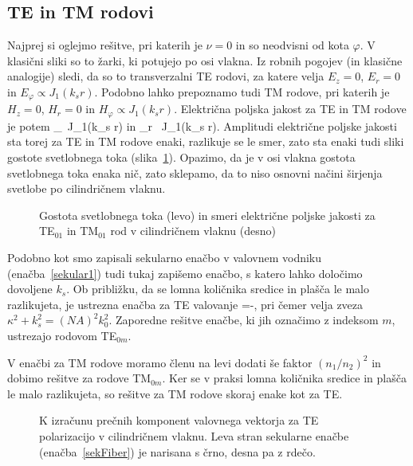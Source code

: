 \subsection*{TE in TM rodovi}
Najprej si oglejmo rešitve, pri katerih je $\nu=0$ in so neodvisni od kota $\varphi$. 
V klasični sliki so to žarki, ki potujejo
po osi vlakna. Iz robnih pogojev (in klasične analogije) sledi, da 
so to transverzalni TE rodovi, za katere velja $E_z=0$, $E_r=0$ in $E_\varphi \propto J_1(k_sr)$.
Podobno lahko prepoznamo tudi TM rodove, pri katerih je $H_z=0$, $H_r=0$ in $H_\varphi \propto J_1(k_sr)$.
Električna poljska jakost za TE in TM rodove je potem
\beq
{} \propto {}_\varphi \, J_1(k_s r) \qquad \textrm{in} \qquad 
{} \propto {}_r \, J_1(k_s r).
\eeq
Amplitudi električne poljske jakosti sta torej za TE in TM rodove enaki, razlikuje se le smer, zato
sta enaki tudi sliki gostote svetlobnega toka (slika~\ref{fig:TE01}). Opazimo, da je v osi
vlakna gostota svetlobnega toka enaka nič, zato sklepamo, da to niso osnovni načini 
širjenja svetlobe po cilindričnem vlaknu. 
\begin{figure}[h]
\centering
\def\svgwidth{100truemm} 

\caption{Gostota svetlobnega toka (levo) in smeri električne poljske jakosti 
za TE$_{01}$ in TM$_{01}$ rod v cilindričnem vlaknu (desno)}
\label{fig:TE01}
\end{figure}

Podobno kot smo zapisali sekularno enačbo v valovnem vodniku (enačba~\ref{sekular1}) tudi tukaj
zapišemo enačbo, s katero lahko določimo dovoljene $k_s$. 
Ob približku, da se lomna količnika 
sredice in plašča le malo razlikujeta, je ustrezna enačba za TE valovanje
\beq
{}=-,
\label{sekFiber}
\eeq
pri čemer velja zveza $\kappa^2+k_s^2=(NA)^2k_0^2$. Zaporedne rešitve enačbe, ki jih označimo 
z indeksom $m$, ustrezajo rodovom TE$_{0m}$. 

V enačbi za TM rodove moramo
členu na levi dodati še faktor $(n_1/n_2)^2$ in dobimo rešitve za rodove TM$_{0m}$. Ker se 
v praksi lomna količnika sredice in plašča le malo razlikujeta, so rešitve za TM rodove skoraj
enake kot za TE.
\begin{figure}[h]
\centering
\def\svgwidth{90truemm} 

\caption{K izračunu prečnih komponent valovnega vektorja za TE polarizacijo v cilindričnem vlaknu.
Leva stran sekularne enačbe (enačba~\ref{sekFiber}) je narisana s črno, desna pa z rdečo.}
\label{fig:TEsecFib}
\end{figure} 


